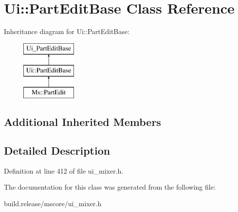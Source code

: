 \hypertarget{class_ui_1_1_part_edit_base}{}\section{Ui\+:\+:Part\+Edit\+Base Class Reference}
\label{class_ui_1_1_part_edit_base}
Inheritance diagram for Ui\+:\+:Part\+Edit\+Base\+:\begin{figure}[H]
\begin{center}
\leavevmode
\includegraphics[height=3.000000cm]{class_ui_1_1_part_edit_base}
\end{center}
\end{figure}
\subsection*{Additional Inherited Members}


\subsection{Detailed Description}


Definition at line 412 of file ui\+\_\+mixer.\+h.



The documentation for this class was generated from the following file\+:\begin{DoxyCompactItemize}
\item 
build.\+release/mscore/ui\+\_\+mixer.\+h\end{DoxyCompactItemize}
